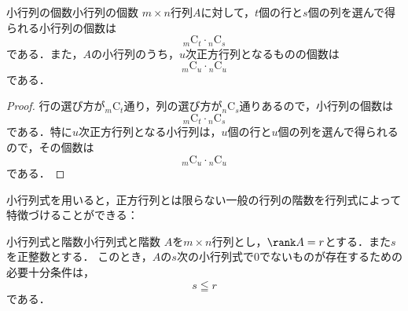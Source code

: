 \begin{prop}{小行列の個数}{小行列の個数}
  $m \times n$行列$A$に対して，$t$個の行と$s$個の列を選んで得られる小行列の個数は
  \[
  {}_m \mathrm{C}_t \cdot {}_n \mathrm{C}_s
  \]
  である．また，$A$の小行列のうち，$u$次正方行列となるものの個数は
  \[
  {}_m \mathrm{C}_u \cdot {}_n \mathrm{C}_u
  \]
  である．
\end{prop}

\begin{tleftbar}
\begin{proof}
  行の選び方が${}_m \mathrm{C}_t$通り，列の選び方が${}_n \mathrm{C}_s$通りあるので，小行列の個数は
  \[
  {}_m \mathrm{C}_t \cdot {}_n \mathrm{C}_s
  \]
  である．特に$u$次正方行列となる小行列は，$u$個の行と$u$個の列を選んで得られるので，その個数は
  \[
  {}_m \mathrm{C}_u \cdot {}_n \mathrm{C}_u
  \]
  である．
\end{proof}
\end{tleftbar}

小行列式を用いると，正方行列とは限らない一般の行列の階数を行列式によって特徴づけることができる：

\begin{prop}{小行列式と階数}{小行列式と階数}
  $A$を$m \times n$行列とし，$\rank A = r$とする．また$s$を正整数とする．
  このとき，$A$の$s$次の小行列式で$0$でないものが存在するための必要十分条件は，
  \[
  s \leqq r
  \]
  である．
\end{prop}


